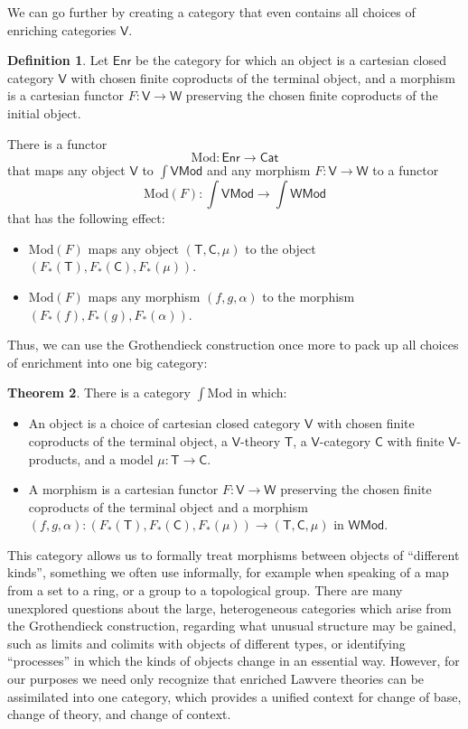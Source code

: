 \documentclass{amsart}
\theoremstyle{definition}
\newtheorem{theorem}{Theorem}
\newtheorem{definition}[theorem]{Definition}
\newcommand{\Cat}{\mathsf{Cat}}
\newcommand{\Mod}{\mathsf{Mod}}
\newcommand{\Enr}{\mathsf{Enr}}
\newcommand{\V}{\mathsf{V}}
\newcommand{\W}{\mathsf{W}}
\newcommand{\C}{\mathsf{C}}
\newcommand{\T}{\mathsf{T}}
\newcommand{\maps}{\colon}
\begin{document}
We can go further by creating a category that even contains all choices of enriching 
categories $\V$.   

\begin{definition}
\label{defn:enrichment}
Let $\Enr$ be the category for which an object is a cartesian closed category $\V$ with chosen finite coproducts of the terminal object, and a morphism is a cartesian
 functor $F \maps \V \to \W$ preserving the chosen finite coproducts of 
the initial object.   
\end{definition}

There is a functor 
\[   \mathrm{Mod} \maps \Enr \to \Cat \]
that maps any object $\V$ to $\int \V\Mod$ and any morphism $F \maps \V \to \W$ to a functor 
\[    \mathrm{Mod}(F) \maps \textstyle{\int \V\Mod \to \int \W\Mod} \]
that has the following effect:
\begin{itemize}
\item  $\mathrm{Mod}(F)$ maps any object $(\T,\C,\mu)$ to
the object $(F_*(\T),F_*(\C),F_*(\mu))$. 
\item $\mathrm{Mod}(F)$ maps any morphism $ (f,g,\alpha)$
to the morphism $(F_*(f),F_*(g),F_*(\alpha))$. 
\end{itemize}
Thus, we can use the Grothendieck construction once more to pack up all choices of 
enrichment into one big category:

\begin{theorem}
There is a category $\int \mathrm{Mod}$ in which:
\begin{itemize}
\item An object is a choice of cartesian closed category $\V$ with chosen finite coproducts
of the terminal object, a $\V$-theory $\T$, a  $\V$-category $\C$ with finite $\V$-products, and a model $\mu \maps \T \to \C$.
\item A morphism is a cartesian functor $F \maps \V \to \W$ preserving the chosen finite
coproducts of the terminal object and a morphism $(f,g,\alpha) \maps (F_*(\T), F_*(\C), F_*(\mu)) \to (\T,\C,\mu)$ in $\W\Mod$.
\end{itemize}
\end{theorem}

This category allows us to formally treat morphisms between objects of ``different kinds'', something we often use informally, for example when speaking of a map from a set to a ring, or a group to a topological group.   There are many unexplored questions about the large, heterogeneous categories which arise from the Grothendieck construction, regarding what unusual structure may be gained, such as limits and colimits with objects of different types, or identifying ``processes'' in which the kinds of objects change in an essential way. However, for our purposes we need only recognize that enriched Lawvere theories can be assimilated into one category, which provides a unified context for change of base, change of theory, and change of context.
\end{document}
